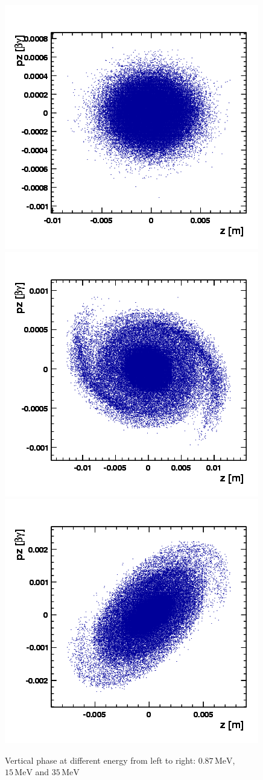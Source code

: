 \begin{figure}[ht]
  \begin{center} 

    \includegraphics[width=0.3\linewidth]{figures/cyclotron/Inj2-z-pz-step-870KeV.png}
    \includegraphics[width=0.3\linewidth]{figures/cyclotron/Inj2-z-pz-step-15MeV.png}
    \includegraphics[width=0.3\linewidth]{figures/cyclotron/Inj2-z-pz-step-30MeV.png}
    \caption{Vertical phase at different energy from left to right: $0.87\,\mathrm{MeV}$, $15\,\mathrm{MeV}$ and $35\,\mathrm{MeV}$}
    \label{fig:cyclphasespace}
  \end{center}
\end{figure}

